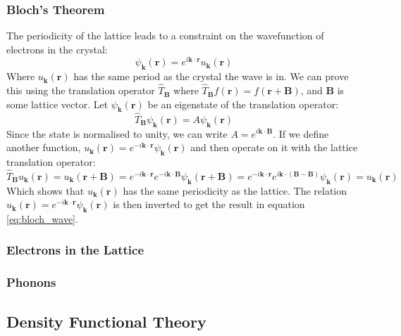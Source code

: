 \documentclass[12pt]{article}
\begin{document}
\subsubsection{Bloch's Theorem}
The periodicity of the lattice leads to a constraint on the wavefunction of electrons in the crystal:
\begin{equation}\label{eq:bloch_wave}
	\psi_\mathbf k(\mathbf r) = e^{i\mathbf{k}\cdot \mathbf{r}}u_\mathbf k(\mathbf r)
\end{equation}
Where $u_\mathbf k(\mathbf r)$ has the same period as the crystal the wave is in.
We can prove this using the translation operator $\hat T_\mathbf B$ where $\hat T_\mathbf B f(\mathbf r) = f(\mathbf r + \mathbf B)$, and $\mathbf B$ is some lattice vector. Let $\psi_\mathbf k(\mathbf r)$ be an eigenstate of the translation operator:
\begin{equation}
	\hat T_\mathbf B \psi_\mathbf k(\mathbf r) = A \psi_\mathbf k(\mathbf r)
\end{equation}
Since the state is normalised to unity, we can write $A=e^{i\mathbf k \cdot \mathbf B}$. If we define another function, $u_\mathbf k(\mathbf r) = e^{-i\mathbf k \cdot \mathbf r}\psi_\mathbf k(\mathbf r)$ and then operate on it with the lattice translation operator:
\begin{equation}\label{eq:bloch_proof}
\hat T_\mathbf B u_\mathbf k(\mathbf r) = u_\mathbf k(\mathbf r + \mathbf B) = 
e^{-i\mathbf k \cdot \mathbf r}e^{-i\mathbf k \cdot \mathbf B} \psi_\mathbf k(\mathbf r + \mathbf B) = 
e^{-i\mathbf k \cdot \mathbf r}e^{i\mathbf k \cdot (\mathbf B - \mathbf B)} \psi_\mathbf k(\mathbf r) = u_\mathbf k(\mathbf r)
\end{equation}
Which shows that $u_\mathbf k(\mathbf r)$ has the same periodicity as the lattice. The relation $u_\mathbf k(\mathbf r) = e^{-i \mathbf k \cdot \mathbf r}\psi_\mathbf k(\mathbf r)$ is then inverted to get the result in equation \ref{eq:bloch_wave}.
\subsubsection{Electrons in the Lattice}
\subsubsection{Phonons}
\subsection{Density Functional Theory}
\end{document}
